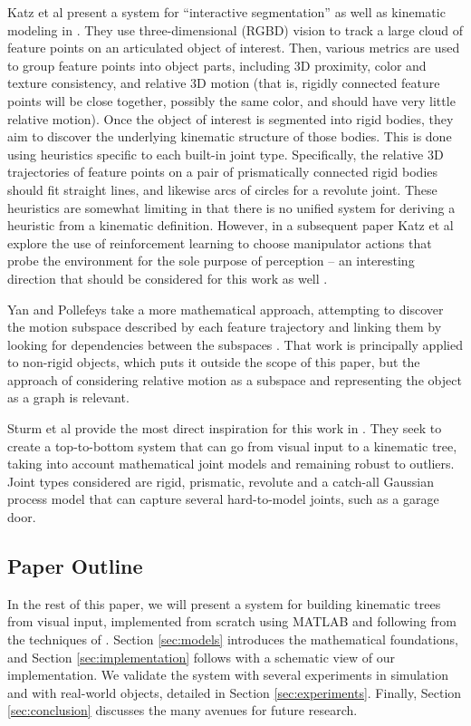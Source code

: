 \documentclass[letterpaper, 10 pt, conference]{ieeeconf}  %
\begin{document}
Katz et al present a system for ``interactive segmentation'' as well as kinematic modeling in \cite{Katz2008}. They use three-dimensional (RGBD) vision to track a large cloud of feature points on an articulated object of interest. Then, various metrics are used to group feature points into object parts, including 3D proximity, color and texture consistency, and relative 3D motion (that is, rigidly connected feature points will be close together, possibly the same color, and should have very little relative motion). Once the object of interest is segmented into rigid bodies, they aim to discover the underlying kinematic structure of those bodies. This is done using heuristics specific to each built-in joint type. Specifically, the relative 3D trajectories of feature points on a pair of prismatically connected rigid bodies should fit straight lines, and likewise arcs of circles for a revolute joint. These heuristics are somewhat limiting in that there is no unified system for deriving a heuristic from a kinematic definition. However, in a subsequent paper Katz et al explore the use of reinforcement learning to choose manipulator actions that probe the environment for the sole purpose of perception -- an interesting direction that should be considered for this work as well \cite{Katz2008a}.

Yan and Pollefeys take a more mathematical approach, attempting to discover the motion subspace described by each feature trajectory and linking them by looking for dependencies between the subspaces \cite{Yan2006}. That work is principally applied to non-rigid objects, which puts it outside the scope of this paper, but the approach of considering relative motion as a subspace and representing the object as a graph is relevant.

Sturm et al provide the most direct inspiration for this work in \cite{Sturm2011}. They seek to create a top-to-bottom system that can go from visual input to a kinematic tree, taking into account mathematical joint models and remaining robust to outliers. Joint types considered are rigid, prismatic, revolute and a catch-all Gaussian process model that can capture several hard-to-model joints, such as a garage door.

\subsection{Paper Outline}

In the rest of this paper, we will present a system for building kinematic trees from visual input, implemented from scratch using MATLAB and following from the techniques of \cite{Sturm2011}. Section \ref{sec:models} introduces the mathematical foundations, and Section \ref{sec:implementation} follows with a schematic view of our implementation. We validate the system with several experiments in simulation and with real-world objects, detailed in Section \ref{sec:experiments}. Finally, Section \ref{sec:conclusion} discusses the many avenues for future research.
\end{document}
